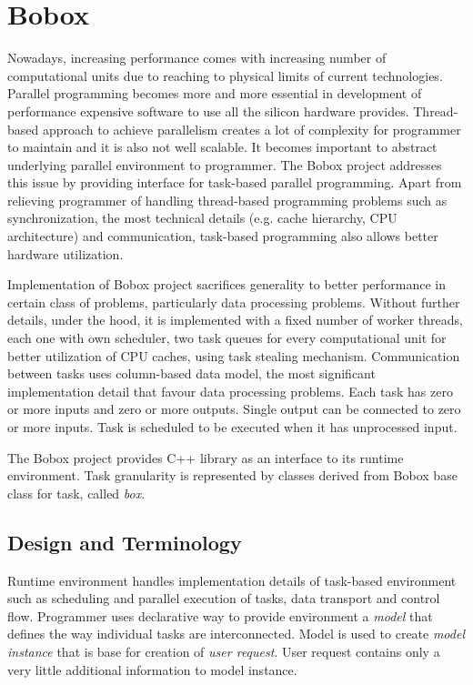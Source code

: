 \chapter{Bobox}
Nowadays, increasing performance comes with increasing number of computational units due to reaching to physical limits of current technologies. Parallel programming becomes more and more essential in development of performance expensive software to use all the silicon hardware provides. Thread-based approach to achieve parallelism creates a lot of complexity for programmer to maintain and it is also not well scalable. It becomes important to abstract underlying parallel environment to programmer. The Bobox project addresses this issue by providing interface for task-based parallel programming. Apart from relieving programmer of handling thread-based programming problems such as synchronization, the most technical details (e.g. cache hierarchy, CPU architecture) and communication, task-based programming also allows better hardware utilization.

Implementation of Bobox project sacrifices generality to better performance in certain class of problems, particularly data processing problems. Without further details, under the hood, it is implemented with a fixed number of worker threads, each one with own scheduler, two task queues for every computational unit for better utilization of CPU caches, using task stealing mechanism. Communication between tasks uses column-based data model, the most significant implementation detail that favour data processing problems. Each task has zero or more inputs and zero or more outputs. Single output can be connected to zero or more inputs. Task is scheduled to be executed when it has unprocessed input.

The Bobox project provides C++ library as an interface to its runtime environment. Task granularity is represented by classes derived from Bobox base class for task, called \emph{box}.

\section{Design and Terminology}
Runtime environment handles implementation details of task-based environment such as scheduling and parallel execution of tasks, data transport and control flow. Programmer uses declarative way to provide environment a \emph{model} that defines the way individual tasks are interconnected. Model is used to create \emph{model instance} that is base for creation of \emph{user request}. User request contains only a very little additional information to model instance.

